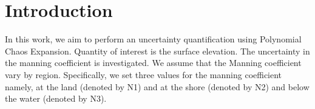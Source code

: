 
\section{Introduction} 

In this work, we aim to perform an uncertainty quantification
using Polynomial Chaos Expansion. Quantity of interest is the surface elevation.
The uncertainty in the manning coefficient is investigated.
We assume that the Manning coefficient vary by region. Specifically,
we set three values for the manning coefficient namely, at the land (denoted by N1)
and at the shore (denoted by N2) and below the water (denoted by N3).


\cite{sraj:2013a}
\cite{sraj:2013b}
